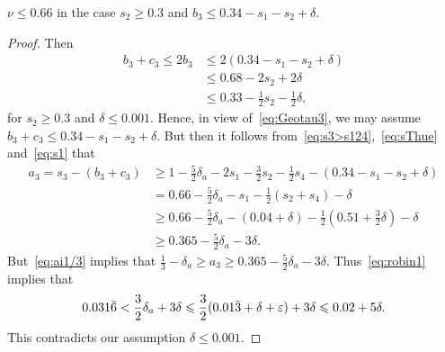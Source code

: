 \begin{lemma}\label{lem:Subcase1.1}
  \leanok
  $\nu \leq 0.66$ in the case $s_2 \geq 0.3$ and $b_3\le 0.34-s_1-s_2+\delta$.
\end{lemma}
\begin{proof}
  \leanok
  Then
  \begin{align*}
  b_3+c_3\le 2b_3
  &\le 2(0.34-s_1-s_2+\delta)\\
  &\le 0.68-2s_2 +2\delta \\
  &\leq 0.33 -\frac{1}{2}s_2-\frac{1}{2}\delta,
  \end{align*}
  for $s_2\ge0.3$ and $\delta\leq 0.001$.
  Hence, in view of~\eqref{eq:Geotau3}, we may assume $b_3+c_3\le 0.34-s_1-s_2+\delta$.
  But then it follows from~\eqref{eq:s3>s124},~\eqref{eq:sThue} and~\eqref{eq:s1} that
  \begin{align*}
  a_3 = s_3 - (b_3 + c_3)
  & \ge 1 -
  \frac{5}{2}\delta_a-
  2s_1 - \frac{3}{2}s_2 - \frac{1}{2}s_4 - (0.34-s_1-s_2+\delta)\\
  & = 0.66
  -\frac{5}{2}\delta_a
  - s_1 - \frac{1}{2}(s_2 + s_4)-\delta\\
  & \geq 0.66
  -\frac{5}{2}\delta_a
  - (0.04+\delta) - \frac{1}{2}(0.51+\frac{3}{2}\delta)-\delta\\
  &\ge 0.365
  -\frac{5}{2}\delta_a -3\delta.
  \end{align*}
  But~\eqref{eq:ai1/3} implies that $\frac{1}{3}-\delta_a \ge a_3\geq 0.365
  -\frac{5}{2}\delta_a -3\delta$. Thus~\eqref{eq:robin1} implies that
  \[
  0.031\bar 6<\frac{3}{2}\delta_a +3\delta
  \leqslant \frac{3}{2}(0.01\bar{3}+\delta+\varepsilon) +3\delta \leqslant 0.02+5\delta.
  \]
  This contradicts our assumption $\delta\leq 0.001$.
\end{proof}

